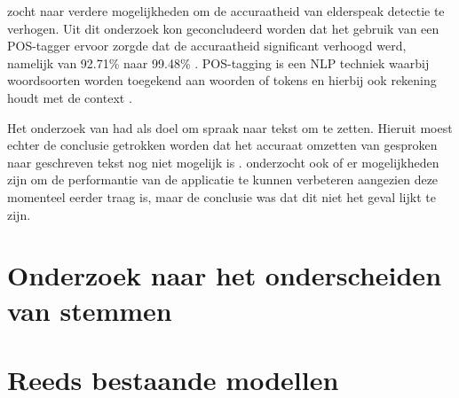 \textcite{Branden2024} zocht naar verdere mogelijkheden om de accuraatheid van elderspeak detectie te verhogen. Uit dit onderzoek kon geconcludeerd worden dat het gebruik van een POS-tagger ervoor zorgde dat de accuraatheid significant verhoogd werd, namelijk van 92.71\% naar 99.48\% \autocite{Branden2024}. POS-tagging is een NLP techniek waarbij woordsoorten worden toegekend aan woorden of tokens en hierbij ook rekening houdt met de context \autocite{Branden2024}.

Het onderzoek van \textcite{Schryver2024} had als doel om spraak naar tekst om te zetten. Hieruit moest echter de conclusie getrokken worden dat het accuraat omzetten van gesproken naar geschreven tekst nog niet mogelijk is \autocite{Schryver2024}. \textcite{Schryver2024} onderzocht ook of er mogelijkheden zijn om de performantie van de applicatie te kunnen verbeteren aangezien deze momenteel eerder traag is, maar de conclusie was dat dit niet het geval lijkt te zijn.

\section{Onderzoek naar het onderscheiden van stemmen}

\section{Reeds bestaande modellen}

